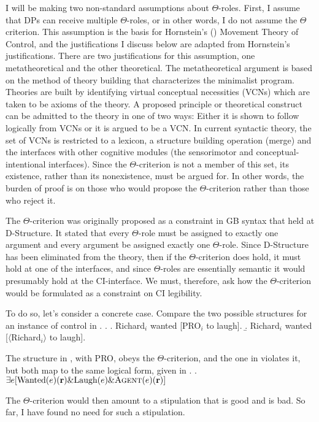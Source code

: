 \documentclass[letterpaper,12pt]{article}
\begin{document}
I will be making two non-standard assumptions about $\Theta$-roles.
First, I assume that DPs can receive multiple $\Theta$-roles, or in other words, I do not assume the $\Theta$ criterion.
This assumption is the basis for Hornstein's (\citeyear{hornstein1999movement,hornstein2009theory}) Movement Theory of Control, and the justifications I discuss below are adapted from Hornstein's justifications.
There are two justifications for this assumption, one metatheoretical and the other theoretical.
The metatheoretical argument is based on the method of theory building that characterizes the minimalist program.
Theories are built by identifying virtual conceptual necessities (VCNs) which are taken to be axioms of the theory.
A proposed principle or theoretical construct can be admitted to the theory in one of two ways:
Either it is shown to follow logically from VCNs or it is argued to be a VCN.
In current syntactic theory, the set of VCNs is restricted to a lexicon, a structure building operation (merge) and the interfaces with other cognitive modules (the sensorimotor and conceptual-intentional interfaces).
Since the $\Theta$-criterion is not a member of this set, its existence, rather than its nonexistence, must be argued for.
In other words, the burden of proof is on those who would propose the $\Theta$-criterion rather than those who reject it.

The $\Theta$-criterion was originally proposed as a constraint in GB syntax that held at D-Structure. 
It stated that every $\Theta$-role must be assigned to exactly one argument and every argument be assigned exactly one $\Theta$-role.
Since D-Structure has been eliminated from the theory, then if the $\Theta$-criterion does hold, it must hold at one of the interfaces, and since $\Theta$-roles are essentially semantic it would presumably hold at the CI-interface.
We must, therefore, ask how the $\Theta$-criterion would be formulated as a constraint on CI legibility.

To do so, let's consider a concrete case.
Compare the two possible structures for an instance of control in \Next.
\ex.
\a. Richard$_i$ wanted [PRO$_i$ to laugh].
\b. Richard$_i$ wanted [$\langle$Richard$_i\rangle$ to laugh].

The structure in \Last[a], with PRO, obeys the $\Theta$-criterion, and the one in \Last[b] violates it, but both map to the same logical form, given in \Next.
\ex. $\exists e [\text{Wanted}(e)(\textbf{r}) \& \text{Laugh}(e) \& \textsc{Agent}(e)(\textbf{r})]$

The $\Theta$-criterion would then amount to a stipulation that \LLast[a] is good and \LLast[b] is bad.
So far, I have found no need for such a stipulation.
\end{document}
